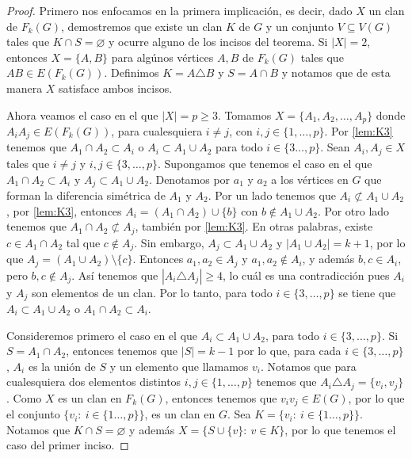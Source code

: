 \begin{proof}
    Primero nos enfocamos en la primera implicaci\'on, es decir, dado $X$ un
    clan de $F_k(G)$, demostremos que existe un clan $K$ de $G$ y un conjunto $V
    \subseteq V(G)$ tales que $K \cap S = \varnothing$ y ocurre alguno de los
    incisos del teorema. Si $|X|=2$, entonces $X= \{A, B\}$ para alg\'unos
    v\'ertices $A, B$ de $F_k(G)$ tales que $AB \in E(F_k(G))$. Definimos $K = A
    \triangle B$ y $S=A \cap B$ y notamos que de esta manera $X$ satisface ambos
    incisos.

    Ahora veamos el caso en el que $|X|= p \geq 3$. Tomamos $X=\{A_1, A_2,
    \dots, A_p\}$ donde $A_i{A_j} \in E(F_k(G))$, para cualesquiera $i\neq j$,
    con $i,j \in \{1, \dots, p\}$. Por \cref{lem:K3} tenemos que $A_1\cap A_2
    \subset A_i$ o $A_i \subset A_1 \cup A_2$ para todo $i \in \{3 \dots,p \}$.
    Sean $A_i, A_j \in X$ tales que $i \neq j$ y $i, j \in \{3, \dots, p\}$.
    Supongamos que tenemos el caso en el que $A_1\cap A_2 \subset A_i$ y $A_j
    \subset A_1 \cup A_2$. Denotamos por $a_1$ y $a_2$ a los v\'ertices en $G$
    que forman la diferencia sim\'etrica de $A_1$ y $A_2$. Por un lado tenemos
    que $A_i \not\subset A_1\cup A_2$, por \cref{lem:K3}, entonces $A_i =
    (A_1\cap A_2) \cup \{b\}$ con $b \notin A_1\cup A_2$. Por otro lado tenemos
    que $A_1 \cap A_2 \not\subset A_j$, tambi\'en por \cref{lem:K3}. En otras
    palabras, existe $c \in A_1 \cap A_2$ tal que $c \notin A_j$. Sin embargo,
    $A_j \subset A_1 \cup A_2$ y $|A_1 \cup A_2| =k+1$, por lo que $A_j = (A_1
    \cup A_2)\setminus \{c\}$. Entonces $a_1, a_2 \in A_j$ y $a_1, a_2 \notin
    A_i$, y adem\'as $b, c \in A_i$, pero $b, c \notin A_j$. As\'i tenemos que
    $|A_i \triangle A_j| \geq 4$, lo cu\'al es una contradicci\'on pues $A_i$ y
    $A_j$ son elementos de un clan. Por lo tanto, para todo $i\in \{3, \dots,
    p\}$ se tiene que $A_i \subset A_1\cup A_2$ o $A_1 \cap A_2 \subset A_i$.

    Consideremos primero el caso en el que $A_i \subset A_1\cup A_2$, para todo
    $i\in \{3, \dots, p\}$. Si $S= A_1 \cap A_2$, entonces tenemos que $|S|
    =k-1$ por lo que, para cada $i \in \{3, \dots, p\}$, $A_i$ es la uni\'on de
    $S$ y un elemento que llamamos $v_i$. Notamos que para cualesquiera dos
    elementos distintos $i, j \in \{1, \dots, p\}$ tenemos que $A_i \triangle
    A_j = \{v_i, v_j\}$. Como $X$ es un clan en $F_k(G)$, entonces tenemos que
    $v_i{v_j} \in E(G)$, por lo que el conjunto $\{v_i\colon\ i \in \{1 \dots,
    p\}\}$, es un clan en $G$.   Sea $K = \{v_i\colon\ i \in \{1 \dots, p\}\}$.
    Notamos que  $K \cap S = \varnothing$ y adem\'as $X= \{S \cup \{v\}\colon\ v
    \in K\}$, por lo que tenemos el caso del primer inciso.


\end{proof}
